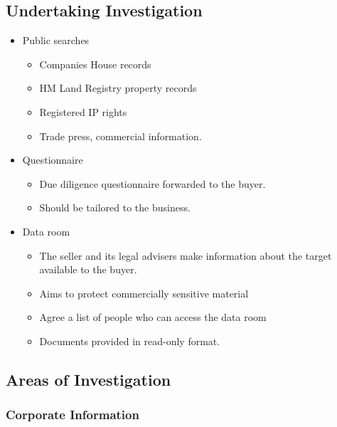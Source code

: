 \documentclass[
]{article}
\providecommand{\tightlist}{%
  \setlength{\itemsep}{0pt}\setlength{\parskip}{0pt}}
\begin{document}
\hypertarget{undertaking-investigation}{%
\subsection{Undertaking Investigation}\label{undertaking-investigation}}

\begin{itemize}
\tightlist
\item
  Public searches

  \begin{itemize}
  \tightlist
  \item
    Companies House records
  \item
    HM Land Registry property records
  \item
    Registered IP rights
  \item
    Trade press, commercial information.
  \end{itemize}
\item
  Questionnaire

  \begin{itemize}
  \tightlist
  \item
    Due diligence questionnaire forwarded to the buyer.
  \item
    Should be tailored to the business.
  \end{itemize}
\item
  Data room

  \begin{itemize}
  \tightlist
  \item
    The seller and its legal advisers make information about the target
    available to the buyer.
  \item
    Aims to protect commercially sensitive material
  \item
    Agree a list of people who can access the data room
  \item
    Documents provided in read-only format.
  \end{itemize}
\end{itemize}

\hypertarget{areas-of-investigation}{%
\subsection{Areas of Investigation}\label{areas-of-investigation}}

\hypertarget{corporate-information}{%
\subsubsection{Corporate Information}\label{corporate-information}}
\end{document}

